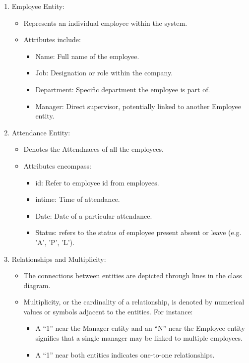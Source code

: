 \documentclass[a4paper, 12pt]{article}
\begin{document}
\begin{enumerate}
    \item Employee Entity:
    \begin{itemize}
        \item Represents an individual employee within the system.
        \item Attributes include:
        \begin{itemize}
            \item Name: Full name of the employee.
            \item Job: Designation or role within the company.
            \item Department: Specific department the employee is part of.
            \item Manager: Direct supervisor, potentially linked to another Employee entity.
        \end{itemize}
    \end{itemize}
    \item Attendance Entity:
    \begin{itemize}
        \item Denotes the Attendnaces of all the employees.
        \item Attributes encompass:
        \begin{itemize}
            \item id: Refer to employee id from employees.
            \item intime: Time of attendance.
            \item Date: Date of a particular attendance.
            \item Status: refers to the status of employee present absent or leave (e.g. 'A', 'P', 'L').
        \end{itemize}
    \end{itemize}
    \item Relationships and Multiplicity:
    \begin{itemize}
        \item The connections between entities are depicted through lines in the class diagram.
        \item Multiplicity, or the cardinality of a relationship, is denoted by numerical values or symbols adjacent to the entities. For instance:
        \begin{itemize}
            \item A “1” near the Manager entity and an “N” near the Employee entity signifies that a single manager may be linked to multiple employees.
            \item A “1” near both entities indicates one-to-one relationships.
        \end{itemize}
    \end{itemize}
\end{enumerate}
\end{document}
